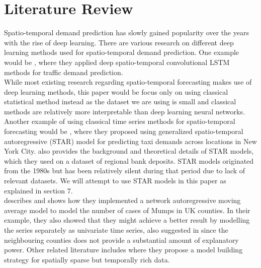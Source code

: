 \documentclass[nonblindrev,msom]{informs3} %
\begin{document}
\newpage
\section{Literature Review}

\noindent Spatio-temporal demand prediction has slowly gained popularity over the years with the rise of deep learning. There are various research on different deep learning methods used for spatio-temporal demand prediction. One example would be \cite{Wang2018}, where they applied deep spatio-temporal convolutional LSTM methods for traffic demand prediction. \\

\noindent While most existing research regarding spatio-temporal forecasting makes use of deep learning methods, this paper would be focus only on using classical statistical method instead as the dataset we are using is small and classical methods are relatively more interpretable than deep learning neural networks. Another example of using classical time series methods for spatio-temporal forecasting would be \cite{Abolfazl2017}, where they proposed using generalized spatio-temporal autoregressive (STAR) model for predicting taxi demands across locations in New York City. \cite{KURT20152537} also provides the background and theoretical details of STAR models, which they used on a dataset of regional bank deposits. STAR models originated from the 1980s but has been relatively silent during that period due to lack of relevant datasets. We will attempt to use STAR models in this paper as explained in section 7. \\

\noindent \cite{Marina2016} describes and shows how they implemented a network autoregressive moving average model to model the number of cases of Mumps in UK counties. In their example, they also showed that they might achieve a better result by modelling the series separately as univariate time series, also suggested in \cite{Nunes2015} since the neighbouring counties does not provide a substantial amount of explanatory power.  Other related literature includes \cite{Xavier2005} where they propose a model building strategy for spatially sparse but temporally rich data. \\
\end{document}
